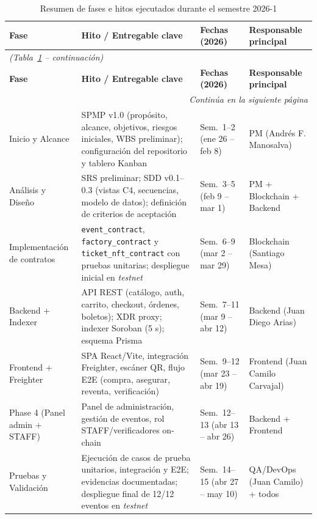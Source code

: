 \documentclass[12pt,oneside]{report}
\begin{document}
      \begin{longtable}{@{}p{3.0cm} p{5.2cm} p{2.8cm} p{3.2cm}@{}}
        \caption{Resumen de fases e hitos ejecutados durante el semestre 2026-1}
        \label{tab:fases-hitos}\\
        \toprule
        \textbf{Fase} & \textbf{Hito / Entregable clave} & \textbf{Fechas (2026)} & \textbf{Responsable principal}\\
        \midrule
        \endfirsthead
        \multicolumn{4}{l}{\textit{(Tabla~\ref{tab:fases-hitos} -- continuación)}}\\
        \toprule
        \textbf{Fase} & \textbf{Hito / Entregable clave} & \textbf{Fechas (2026)} & \textbf{Responsable principal}\\
        \midrule
        \endhead
        \midrule
        \multicolumn{4}{r}{\textit{Continúa en la siguiente página}}\\
        \endfoot
        \bottomrule
        \endlastfoot
        Inicio y Alcance & SPMP v1.0 (propósito, alcance, objetivos, riesgos iniciales, WBS preliminar); configuración del repositorio y tablero Kanban & Sem.~1--2 (ene 26 -- feb 8) & PM (Andrés F. Manosalva)\\
        \midrule
        Análisis y Diseño & SRS preliminar; SDD v0.1--0.3 (vistas C4, secuencias, modelo de datos); definición de criterios de aceptación & Sem.~3--5 (feb 9 -- mar 1) & PM + Blockchain + Backend\\
        \midrule
        Implementación de contratos & \texttt{event\_contract}, \texttt{factory\_contract} y \texttt{ticket\_nft\_contract} con pruebas unitarias; despliegue inicial en \textit{testnet} & Sem.~6--9 (mar 2 -- mar 29) & Blockchain (Santiago Mesa)\\
        \midrule
        Backend + Indexer & API REST (catálogo, auth, carrito, checkout, órdenes, boletos); XDR proxy; indexer Soroban (5 s); esquema Prisma & Sem.~7--11 (mar 9 -- abr 12) & Backend (Juan Diego Arias)\\
        \midrule
        Frontend + Freighter & SPA React/Vite, integración Freighter, escáner QR, flujo E2E (compra, asegurar, reventa, verificación) & Sem.~9--12 (mar 23 -- abr 19) & Frontend (Juan Camilo Carvajal)\\
        \midrule
        Phase 4 (Panel admin + STAFF) & Panel de administración, gestión de eventos, rol STAFF/verificadores on-chain & Sem.~12--13 (abr 13 -- abr 26) & Backend + Frontend\\
        \midrule
        Pruebas y Validación & Ejecución de casos de prueba unitarios, integración y E2E; evidencias documentadas; despliegue final de 12/12 eventos en \textit{testnet} & Sem.~14--15 (abr 27 -- may 10) & QA/DevOps (Juan Camilo) + todos\\

\end{longtable}
\end{document}
